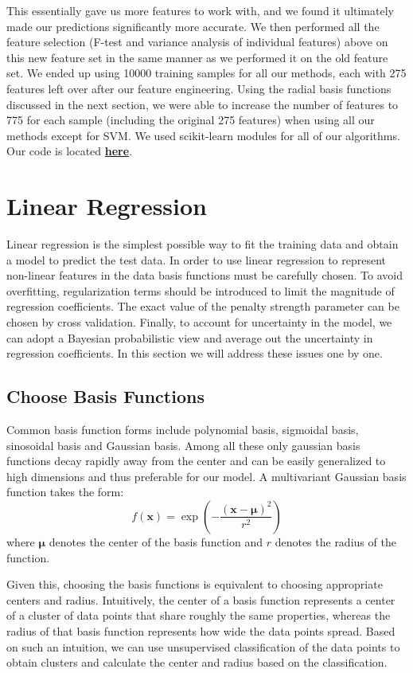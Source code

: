 \documentclass[11pt]{article}
\begin{document}
This essentially gave us more features to work with, and we found it ultimately made our predictions significantly more accurate. We then performed all the feature selection (F-test and variance analysis of individual features) above on this new feature set in the same manner as we performed it on the old feature set. We ended up using 10000 training samples for all our methods, each with 275 features left over after our feature engineering. Using the radial basis functions discussed in the next section, we were able to increase the number of features to 775 for each sample (including the original 275 features) when using all our methods except for SVM. We used scikit-learn modules for all of our algorithms. Our code is located \href{https://github.com/bboz862/practical1.git}{\textbf{here}}.


\section{Linear Regression}
Linear regression is the simplest possible way to fit the training data and obtain a model to predict the test data. In order to use linear regression to represent non-linear features in the data basis functions must be carefully chosen. To avoid overfitting, regularization terms should be introduced to limit the magnitude of regression coefficients. The exact value of the penalty strength parameter can be chosen by cross validation. Finally, to account for uncertainty in the model, we can adopt a Bayesian probabilistic view and average out the uncertainty in regression coefficients. In this section we will address these issues one by one.
\subsection{Choose Basis Functions}\label{choose basis function}
Common basis function forms include polynomial basis, sigmoidal basis, sinosoidal basis and Gaussian basis. Among all these only gaussian basis functions decay rapidly away from the center and can be easily generalized to high dimensions and thus preferable for our model. A multivariant Gaussian basis function takes the form:
$$f(\textbf{x}) = \exp \left(-\frac{(\textbf{x} - \boldsymbol{\mu})^2}{r^2}\right)$$
where $\boldsymbol{\mu}$ denotes the center of the basis function and $r$ denotes the radius of the function. 

Given this, choosing the basis functions is equivalent to choosing appropriate centers and radius. Intuitively, the center of a basis function represents a center of a cluster of data points that share roughly the same properties, whereas the radius of that basis function represents how wide the data points spread. Based on such an intuition, we can use unsupervised classification of the data points to obtain clusters and calculate the center and radius based on the classification.
\end{document}
